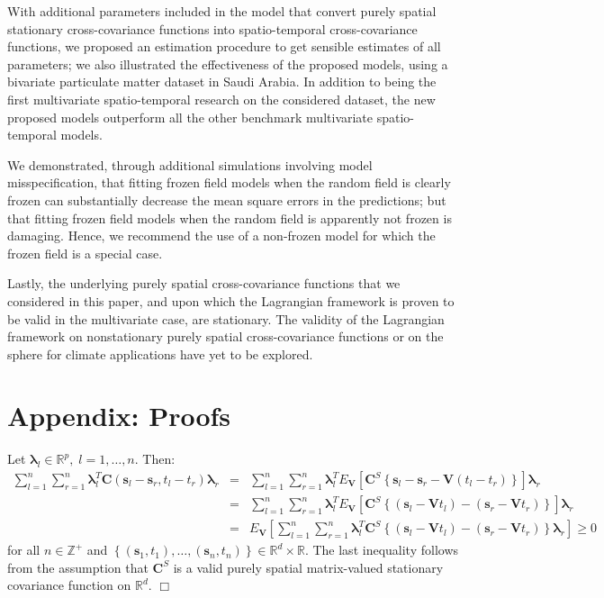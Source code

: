 \documentclass[12pt]{article}
\newcommand{\0}{\mathbf{0}}
\begin{document}
With additional parameters included in the model that convert purely spatial stationary cross-covariance functions into spatio-temporal cross-covariance functions, we proposed an estimation procedure to get sensible estimates of all parameters; we also illustrated the effectiveness of the proposed models, using a bivariate particulate matter dataset in Saudi Arabia. In addition to being the first multivariate spatio-temporal research on the considered dataset, the new proposed models outperform all the other benchmark multivariate spatio-temporal models. 

We demonstrated, through additional simulations involving model misspecification, that fitting frozen field models when the random field is clearly frozen can substantially decrease the mean square errors in the predictions; but that fitting frozen field models when the random field is apparently not frozen is damaging. Hence, we recommend the use of a non-frozen model for which the frozen field is a special case.

Lastly, the underlying purely spatial cross-covariance functions that we considered in this paper, and upon which the Lagrangian framework is proven to be valid in the multivariate case, are stationary. The validity of the Lagrangian framework on nonstationary purely spatial cross-covariance functions \citep[e.g.,][]{2012KN} or on the sphere for climate applications \citep[e.g.,][]{2013CS} have yet to be explored.


\section*{Appendix: Proofs}


Let $\boldsymbol{\lambda}_l\in\mathbb{R}^{p}, \;l=1,\ldots,n.$ Then:
\begin{eqnarray*}
\sum_{l=1}^{n}\sum_{r=1}^{n}\boldsymbol{\lambda}_l^T\mathbf{C}(\mathbf{s}_{l}-\mathbf{s}_{r},t_{l}-t_{r})\boldsymbol{\lambda}_r &=& \sum_{l=1}^{n}\sum_{r=1}^{n}\boldsymbol{\lambda}_l^TE_{\mathbf{V}}\left[\mathbf{C}^S\left\{\mathbf{s}_l-\mathbf{s}_r-\mathbf{V}(t_l-t_r)\right\}\right]\boldsymbol{\lambda}_r \\
&=&\sum_{l=1}^{n}\sum_{r=1}^{n}\boldsymbol{\lambda}_l^TE_{\mathbf{V}}\left[\mathbf{C}^S\left\{(\mathbf{s}_l-\mathbf{V}t_l)-(\mathbf{s}_r-\mathbf{V}t_r)\right\}\right]\boldsymbol{\lambda}_r \\
&=&E_{\mathbf{V}}\left[\sum_{l=1}^{n}\sum_{r=1}^{n}\boldsymbol{\lambda}_l^T\mathbf{C}^S\left\{(\mathbf{s}_l-\mathbf{V}t_l)-(\mathbf{s}_r-\mathbf{V}t_r)\right\}\boldsymbol{\lambda}_r \right]\geq 0 
\end{eqnarray*}
for all $n\in\mathbb{Z}^+$ and $\left\{(\mathbf{s}_1,t_1),\ldots,(\mathbf{s}_n,t_n)\right\} \in \mathbb{R}^d\times \mathbb{R}$. The last inequality follows from the assumption that $\mathbf{C}^S$ is a valid purely spatial matrix-valued stationary covariance function on $\mathbb{R}^d$. \hfill $\Box$ \\
\vspace{-.8cm}
\end{document}
